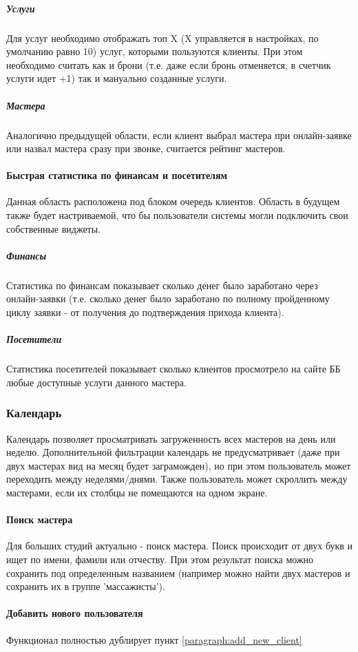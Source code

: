 \documentclass[DIV=calc, paper=a4, fontsize=11pt]{scrartcl} %
\begin{document}
\subparagraph{Услуги}
Для услуг необходимо отображать топ X (X управляется в настройках, по умолчанию равно 10) услуг, которыми пользуются клиенты. При этом необходимо считать как и брони (т.е. даже если бронь отменяется, в счетчик услуги идет +1) так и мануально созданные услуги.

\subparagraph{Мастера}
Аналогично предыдущей области, если клиент выбрал мастера при онлайн-заявке или назвал мастера сразу при звонке, считается рейтинг мастеров.

\paragraph{Быстрая статистика по финансам и посетителям}
Данная область расположена под блоком очередь клиентов. Область в будущем также будет настриваемой, что бы пользователи системы могли подключить свои собственные виджеты.
\subparagraph{Финансы}
Статистика по финансам показывает сколько денег было заработано через онлайн-заявки (т.е. сколько денег было заработано по полному пройденному циклу заявки - от получения до подтверждения прихода клиента).
\subparagraph{Посетители}
Статистика посетителей показывает сколько клиентов просмотрело на сайте ББ любые доступные услуги данного мастера.

\subsubsection{Календарь}
Календарь позволяет просматривать загруженность всех мастеров на день или неделю. Дополнительной фильтрации календарь не предусматривает (даже при двух мастерах вид на месяц будет заграможден), но при этом пользователь может переходить между неделями/днями. Также пользователь может скроллить между мастерами, если их столбцы не помещаются на одном экране.

\paragraph{Поиск мастера}
Для больших студий актуально - поиск мастера. Поиск происходит от двух букв и ищет по имени, фамили или отчеству. При этом результат поиска можно сохранить под определенным названием (например можно найти двух мастеров и сохранить их в группе 'массажисты').
\paragraph{Добавить нового пользователя}
Функционал полностью дублирует пункт \ref{paragraph:add_new_client}
\end{document}
